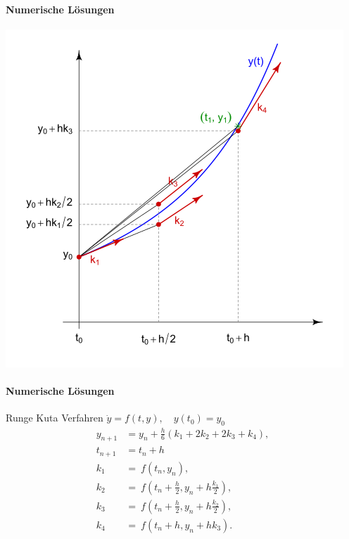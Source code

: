 \documentclass{beamer}
\begin{document}
 \begin{frame}
\framesubtitle{Numerische Lösungen}
\includegraphics[scale=0.6]{images/Runge-Kutta}

\end{frame}

 \begin{frame}
\framesubtitle{Numerische Lösungen}
    \begin{block}{Runge Kuta Verfahren}
$\dot{y}=f(t,y), \quad  y(t_0)=y_0$
\begin{align}
y_{n+1} &= y_n + \frac{h}{6}\left(k_1 + 2k_2 + 2k_3 + k_4 \right),\\
t_{n+1} &= t_n + h \\
 k_1 &= \ f(t_n, y_n), \\
 k_2 &= \ f\!\left(t_n + \frac{h}{2}, y_n + h \frac{k_1}{2}\right), \\ 
 k_3 &= \ f\!\left(t_n + \frac{h}{2}, y_n + h \frac{k_2}{2}\right), \\
 k_4 &= \ f\!\left(t_n + h, y_n + h k_3\right).
\end{align}
    \end{block}
\end{frame}
\end{document}
